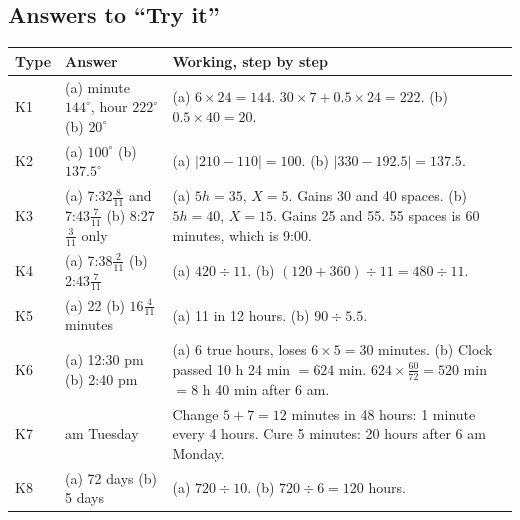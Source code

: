 \documentclass[11pt,a4paper]{article}
\let\oldsubsection\subsection
\renewcommand{\subsection}{\needspace{9\baselineskip}\oldsubsection}
\begin{document}
\subsection*{Answers to ``Try it''}
\begin{center}\small\renewcommand{\arraystretch}{1.25}\setlength{\tabcolsep}{8pt}
\begin{tabularx}{\linewidth}{@{}l>{\raggedright\arraybackslash}p{3.4cm}>{\raggedright\arraybackslash}X@{}}
\toprule
\textbf{\color{slate}Type} & \textbf{\color{slate}Answer} & \textbf{\color{slate}Working, step by step} \\ \midrule
K1 & (a) minute $144^\circ$, hour $222^\circ$ \newline (b) $20^\circ$ & (a) $6 \times 24 = 144$. $30 \times 7 + 0.5 \times 24 = 222$. \newline (b) $0.5 \times 40 = 20$. \\
K2 & (a) $100^\circ$ \newline (b) $137.5^\circ$ & (a) $|210 - 110| = 100$. \newline (b) $|330 - 192.5| = 137.5$. \\
K3 & (a) 7:32$\frac8{11}$ and 7:43$\frac7{11}$ \newline (b) 8:27$\frac3{11}$ only & (a) $5h = 35$, $X = 5$. Gains 30 and 40 spaces. \newline (b) $5h = 40$, $X = 15$. Gains 25 and 55. 55 spaces is 60 minutes, which is 9:00. \\
K4 & (a) 7:38$\frac2{11}$ \newline (b) 2:43$\frac7{11}$ & (a) $420 \div 11$. \newline (b) $(120 + 360) \div 11 = 480 \div 11$. \\
K5 & (a) 22 \newline (b) $16\frac4{11}$ minutes & (a) 11 in 12 hours. \newline (b) $90 \div 5.5$. \\
K6 & (a) 12:30 pm \newline (b) 2:40 pm & (a) 6 true hours, loses $6 \times 5 = 30$ minutes. \newline (b) Clock passed 10 h 24 min $= 624$ min. $624 \times \tfrac{60}{72} = 520$ min $= 8$ h 40 min after 6 am. \\
K7 & 2 am Tuesday & Change $5 + 7 = 12$ minutes in 48 hours: 1 minute every 4 hours. \newline Cure 5 minutes: 20 hours after 6 am Monday. \\
K8 & (a) 72 days \newline (b) 5 days & (a) $720 \div 10$. \newline (b) $720 \div 6 = 120$ hours. \\

\end{tabularx}
\end{center}
\end{document}

